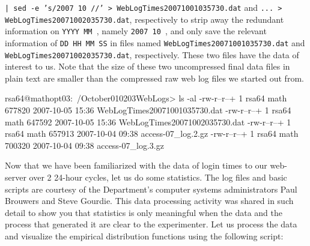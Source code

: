 \begin{data}
{\tt | sed -e 's/2007 10 //' > WebLogTimes20071001035730.dat} and 
{\tt ... > WebLogTimes20071002035730.dat}, respectively to strip away the redundant information on {\tt YYYY MM }, namely {\tt 2007 10 }, and only save the relevant information of {\tt DD HH MM SS} in files named 
{\tt WebLogTimes20071001035730.dat} and {\tt WebLogTimes20071002035730.dat}, respectively.  These two files have the data of interest to us.  Note that the size of these two uncompressed final data files in plain text are smaller than the compressed raw web log files we started out from. 
\begin{VrbM}
rsa64@mathopt03:~/October010203WebLogs> ls -al
-rw-r--r--+  1 rsa64 math 677820 2007-10-05 15:36 WebLogTimes20071001035730.dat
-rw-r--r--+  1 rsa64 math 647592 2007-10-05 15:36 WebLogTimes20071002035730.dat
-rw-r--r--+  1 rsa64 math 657913 2007-10-04 09:38 access-07_log.2.gz
-rw-r--r--+  1 rsa64 math 700320 2007-10-04 09:38 access-07_log.3.gz
\end{VrbM}
Now that we have been familiarized with the data of login times to our web-server over 2 24-hour cycles, let us do some statistics.  The log files and basic scripts are courtesy of the Department's computer systems administrators Paul Brouwers and Steve Gourdie.  This data processing activity was shared in such detail to show you that statistics is only meaningful when the data and the process that generated it are clear to the experimenter.  Let us process the data and visualize the empirical distribution functions using the following script:
{}
\end{data}

